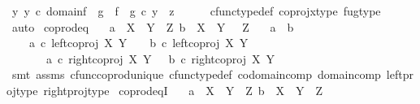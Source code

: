 \begin{isabellebody}
\ {\isachardoublequoteopen}{\isasymexists}y{\isachardot}{\kern0pt}\ y\ {\isasymin}\isactrlsub c\ domain{\isacharparenleft}{\kern0pt}f\ {\isasymamalg}\ g{\isacharparenright}{\kern0pt}\ {\isasymand}\ f\ {\isasymamalg}\ g\ {\isasymcirc}\isactrlsub c\ y\ {\isacharequal}{\kern0pt}\ z{\isachardoublequoteclose}\isanewline
\ \ \ \ \isamarkupfalse%
\ cfunc{\isacharunderscore}{\kern0pt}type{\isacharunderscore}{\kern0pt}def\ coproj{\isacharunderscore}{\kern0pt}x{\isacharunderscore}{\kern0pt}type\ fug{\isacharunderscore}{\kern0pt}type\ \isamarkupfalse%
\ auto\isanewline
{}\isamarkupfalse%
%
\endisatagproof
{\isafoldproof}%
%
\isadelimproof
\isanewline
%
\endisadelimproof
\isanewline
{}\isamarkupfalse%
\ coprod{\isacharunderscore}{\kern0pt}eq{\isacharcolon}{\kern0pt}\isanewline
\ \ \ {\isachardoublequoteopen}a\ {\isacharcolon}{\kern0pt}\ X\ {\isasymCoprod}\ Y\ {\isasymrightarrow}\ Z{\isachardoublequoteclose}\ {\isachardoublequoteopen}b\ {\isacharcolon}{\kern0pt}\ X\ {\isasymCoprod}\ Y\ {\isasymrightarrow}\ \ Z{\isachardoublequoteclose}\isanewline
\ \ \ {\isachardoublequoteopen}a\ {\isacharequal}{\kern0pt}\ b\ {\isasymlongleftrightarrow}\ \isanewline
\ \ \ \ {\isacharparenleft}{\kern0pt}a\ {\isasymcirc}\isactrlsub c\ left{\isacharunderscore}{\kern0pt}coproj\ X\ Y\ \ \ {\isacharequal}{\kern0pt}\ b\ {\isasymcirc}\isactrlsub c\ left{\isacharunderscore}{\kern0pt}coproj\ X\ Y\ \isanewline
\ \ \ \ \ \ {\isasymand}\ a\ {\isasymcirc}\isactrlsub c\ right{\isacharunderscore}{\kern0pt}coproj\ X\ Y\ \ {\isacharequal}{\kern0pt}\ b\ {\isasymcirc}\isactrlsub c\ right{\isacharunderscore}{\kern0pt}coproj\ X\ Y{\isacharparenright}{\kern0pt}{\isachardoublequoteclose}\isanewline
%
\isadelimproof
\ \ %
\endisadelimproof
%
\isatagproof
{}\isamarkupfalse%
\ {\isacharparenleft}{\kern0pt}smt\ assms\ cfunc{\isacharunderscore}{\kern0pt}coprod{\isacharunderscore}{\kern0pt}unique\ cfunc{\isacharunderscore}{\kern0pt}type{\isacharunderscore}{\kern0pt}def\ codomain{\isacharunderscore}{\kern0pt}comp\ domain{\isacharunderscore}{\kern0pt}comp\ left{\isacharunderscore}{\kern0pt}proj{\isacharunderscore}{\kern0pt}type\ right{\isacharunderscore}{\kern0pt}proj{\isacharunderscore}{\kern0pt}type{\isacharparenright}{\kern0pt}%
\endisatagproof
{\isafoldproof}%
%
\isadelimproof
\isanewline
%
\endisadelimproof
\isanewline
{}\isamarkupfalse%
\ coprod{\isacharunderscore}{\kern0pt}eqI{\isacharcolon}{\kern0pt}\isanewline
\ \ \ {\isachardoublequoteopen}a\ {\isacharcolon}{\kern0pt}\ X\ {\isasymCoprod}\ Y\ {\isasymrightarrow}\ Z{\isachardoublequoteclose}\ {\isachardoublequoteopen}b\ {\isacharcolon}{\kern0pt}\ X\ {\isasymCoprod}\ Y\ {\isasymrightarrow}\ Z{\isachardoublequoteclose}\isanewline

\end{isabellebody}
